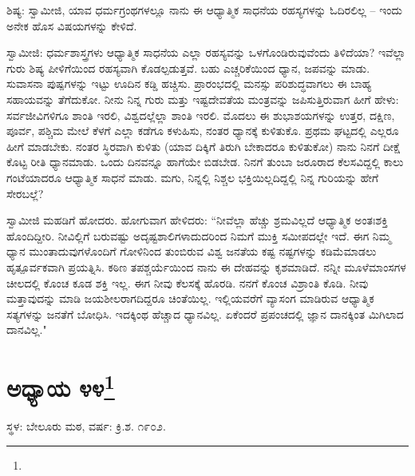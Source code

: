 ಶಿಷ್ಯ: ಸ್ವಾಮೀಜಿ, ಯಾವ ಧರ್ಮಗ್ರಂಥಗಳಲ್ಲೂ ನಾನು ಈ ಆಧ್ಯಾತ್ಮಿಕ ಸಾಧನೆಯ ರಹಸ್ಯಗಳನ್ನು ಓದಿರಲಿಲ್ಲ – ಇಂದು ಅನೇಕ ಹೊಸ ವಿಷಯಗಳನ್ನು ಕೇಳಿದೆ.

ಸ್ವಾಮೀಜಿ: ಧರ್ಮಶಾಸ್ತ್ರಗಳು ಆಧ್ಯಾತ್ಮಿಕ ಸಾಧನೆಯ ಎಲ್ಲಾ ರಹಸ್ಯವನ್ನು ಒಳಗೊಂಡಿರುವುವೆಂದು ತಿಳಿದೆಯಾ? ಇವೆಲ್ಲಾ ಗುರು ಶಿಷ್ಯ ಪೀಳಿಗೆಯಿಂದ ರಹಸ್ಯವಾಗಿ ಕೊಡಲ್ಪಡುತ್ತವೆ. ಬಹು ಎಚ್ಚರಿಕೆಯಿಂದ ಧ್ಯಾನ, ಜಪವನ್ನು ಮಾಡು. ಸುವಾಸನಾ ಪುಷ್ಪಗಳನ್ನು ಇಟ್ಟು ಊದಿನ ಕಡ್ಡಿ ಹಚ್ಚಿಸು. ಪ್ರಾರಂಭದಲ್ಲಿ ಮನಸ್ಸು ಪರಿಶುದ್ಧವಾಗಲು ಈ ಬಾಹ್ಯ ಸಹಾಯವನ್ನು ತೆಗೆದುಕೋ. ನೀನು ನಿನ್ನ ಗುರು ಮತ್ತು ಇಷ್ಟದೇವತೆಯ ಮಂತ್ರವನ್ನು ಜಪಿಸುತ್ತಿರುವಾಗ ಹೀಗೆ ಹೇಳು: ಸರ್ವಜೀವಿಗಳಿಗೂ ಶಾಂತಿ ಇರಲಿ, ವಿಶ್ವದಲ್ಲೆಲ್ಲಾ ಶಾಂತಿ ಇರಲಿ. ಮೊದಲು ಈ ಶುಭಾಶಯಗಳನ್ನು ಉತ್ತರ, ದಕ್ಷಿಣ, ಪೂರ್ವ, ಪಶ್ಚಿಮ ಮೇಲೆ ಕೆಳಗೆ ಎಲ್ಲಾ ಕಡೆಗೂ ಕಳುಹಿಸು, ನಂತರ ಧ್ಯಾನಕ್ಕೆ ಕುಳಿತುಕೊ. ಪ್ರಥಮ ಘಟ್ಟದಲ್ಲಿ ಎಲ್ಲರೂ ಹೀಗೆ ಮಾಡಬೇಕು. ನಂತರ ಸ್ಥಿರವಾಗಿ ಕುಳಿತು (ಯಾವ ದಿಕ್ಕಿಗೆ ತಿರುಗಿ ಬೇಕಾದರೂ ಕುಳಿತುಕೋ) ನಾನು ನಿನಗೆ ದೀಕ್ಷೆ ಕೊಟ್ಟ ರೀತಿ ಧ್ಯಾನಮಾಡು. ಒಂದು ದಿನವನ್ನೂ ಹಾಗೆಯೇ ಬಿಡಬೇಡ. ನಿನಗೆ ತುಂಬಾ ಜರೂರಾದ ಕೆಲಸವಿದ್ದಲ್ಲಿ ಕಾಲು ಗಂಟೆಯಾದರೂ ಆಧ್ಯಾತ್ಮಿಕ ಸಾಧನೆ ಮಾಡು. ಮಗು, ನಿನ್ನಲ್ಲಿ ನಿಶ್ಚಲ ಭಕ್ತಿಯಿಲ್ಲದಿದ್ದಲ್ಲಿ ನಿನ್ನ ಗುರಿಯನ್ನು ಹೇಗೆ ಸೇರಬಲ್ಲೆ?

ಸ್ವಾಮೀಜಿ ಮಹಡಿಗೆ ಹೋದರು. ಹೋಗುವಾಗ ಹೇಳಿದರು: “ನೀವೆಲ್ಲಾ ಹೆಚ್ಚು ಶ್ರಮವಿಲ್ಲದೆ ಆಧ್ಯಾತ್ಮಿಕ ಅಂತಃಶಕ್ತಿ ಹೊಂದಿದ್ದೀರಿ. ನೀವಿಲ್ಲಿಗೆ ಬರುವಷ್ಟು ಅದೃಷ್ಟಶಾಲಿಗಳಾದುದರಿಂದ ನಿಮಗೆ ಮುಕ್ತಿ ಸಮೀಪದಲ್ಲೇ ಇದೆ. ಈಗ ನಿಮ್ಮ ಧ್ಯಾನ ಮುಂತಾದುವುಗಳೊಂದಿಗೆ ಗೋಳಿನಿಂದ ತುಂಬಿರುವ ವಿಶ್ವ ಜನತೆಯ ಕಷ್ಟ ನಷ್ಟಗಳನ್ನು ಕಡಿಮೆಮಾಡಲು ಹೃತ್ಪೂರ್ವಕವಾಗಿ ಪ್ರಯತ್ನಿಸಿ. ಕಠಿಣ ತಪಶ್ಚರ್ಯೆಯಿಂದ ನಾನು ಈ ದೇಹವನ್ನು ಕೃಶಮಾಡಿದೆ. ನನ್ನೀ ಮೂಳೆಮಾಂಸಗಳ ಚೀಲದಲ್ಲಿ ಕೊಂಚ ಕೂಡ ಶಕ್ತಿ ಇಲ್ಲ. ಈಗ ನೀವು ಕೆಲಸಕ್ಕೆ ಹೊರಡಿ. ನನಗೆ ಕೊಂಚ ವಿಶ್ರಾಂತಿ ಕೊಡಿ. ನೀವು ಮತ್ತಾವುದನ್ನು ಮಾಡಿ ಜಯಶೀಲರಾಗದಿದ್ದರೂ ಚಿಂತೆಯಿಲ್ಲ. ಇಲ್ಲಿಯವರೆಗೆ ವ್ಯಾಸಂಗ ಮಾಡಿರುವ ಆಧ್ಯಾತ್ಮಿಕ ಸತ್ಯಗಳನ್ನು ಜನತೆಗೆ ಬೋಧಿಸಿ. ಇದಕ್ಕಿಂಥ ಹೆಚ್ಚಾದ ಧ್ಯಾನವಿಲ್ಲ. ಏಕೆಂದರೆ ಪ್ರಪಂಚದಲ್ಲಿ ಜ್ಞಾನ ದಾನಕ್ಕಿಂತ ಮಿಗಿಲಾದ ದಾನವಿಲ್ಲ."

\newpage

\chapter[ಅಧ್ಯಾಯ ೪೪]{ಅಧ್ಯಾಯ ೪೪\protect\footnote{}}

\centerline{ಸ್ಥಳ: ಬೇಲೂರು ಮಠ, ವರ್ಷ: ಕ್ರಿ.ಶ. ೧೯೦೨.}

